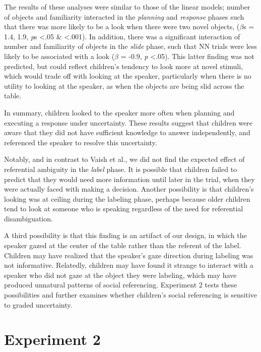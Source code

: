 \documentclass[a4paper,man,apacite,floatsintext]{apa6}
\begin{document}
The results of these analyses were similar to those of the linear
models; number of objects and familiarity interacted in the
\emph{planning} and \emph{response} phases such that there was more
likely to be a look when there were two novel objects, (\(\beta\)s =
1.4, 1.9, \emph{p}s \textless{}.05 \& \textless{}.001). In addition,
there was a significant interaction of number and familiarity of objects
in the \emph{slide} phase, such that NN trials were less likely to be
associated with a look (\(\beta\) = -0.9, \emph{p} \textless{}.05). This
latter finding was not predicted, but could reflect children's tendency
to look more at novel stimuli, which would trade off with looking at the
speaker, particularly when there is no utility to looking at the
speaker, as when the objects are being slid across the table.

In summary, children looked to the speaker more often when planning and
executing a response under uncertainty. These results suggest that
children were aware that they did not have sufficient knowledge to
answer independently, and referenced the speaker to resolve this
uncertainty.

Notably, and in contrast to Vaish et al., we did not find the expected
effect of referential ambiguity in the \emph{label} phase. It is
possible that children failed to predict that they would need more
information until later in the trial, when they were actually faced with
making a decision. Another possibility is that children's looking was at
ceiling during the labeling phase, perhaps because older children tend
to look at someone who is speaking regardless of the need for
referential disambiguation.

A third possibility is that this finding is an artifact of our design,
in which the speaker gazed at the center of the table rather than the
referent of the label. Children may have realized that the speaker's
gaze direction during labeling was not informative. Relatedly, children
may have found it strange to interact with a speaker who did not gaze at
the object they were labeling, which may have produced unnatural
patterns of social referencing. Experiment 2 tests these possibilities
and further examines whether children's social referencing is sensitive
to graded uncertainty.

\section{Experiment 2}\label{experiment-2}
\end{document}
